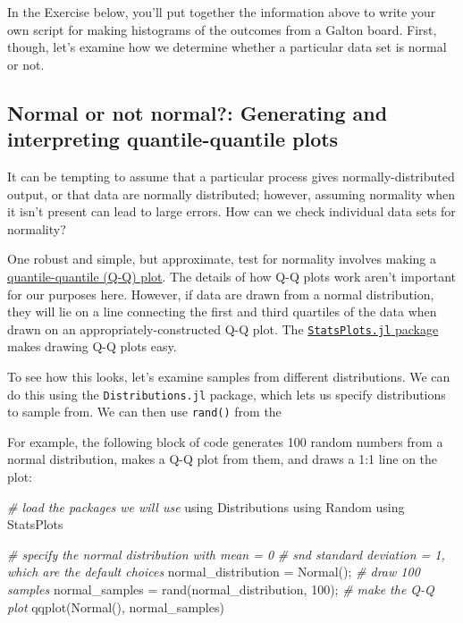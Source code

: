 \documentclass[
  11pt,
]{book}
\newenvironment{Shaded}{\begin{snugshade}}{\end{snugshade}}
\newcommand{\CommentTok}[1]{\textcolor[rgb]{0.37,0.37,0.37}{\textit{#1}}}
\newcommand{\FloatTok}[1]{\textcolor[rgb]{0.06,0.06,0.06}{#1}}
\newcommand{\NormalTok}[1]{#1}
\begin{document}
In the Exercise below, you'll put together the information above to write your own script for making histograms of the outcomes from a Galton board. First, though, let's examine how we determine whether a particular data set is normal or not.

\hypertarget{normal-or-not-normal-generating-and-interpreting-quantile-quantile-plots}{%
\subsection{Normal or not normal?: Generating and interpreting quantile-quantile plots}\label{normal-or-not-normal-generating-and-interpreting-quantile-quantile-plots}}

It can be tempting to assume that a particular process gives normally-distributed output, or that data are normally distributed; however, assuming normality when it isn't present can lead to large errors. How can we check individual data sets for normality?

One robust and simple, but approximate, test for normality involves making a \href{https://en.wikipedia.org/wiki/Q-Q_plot}{quantile-quantile (Q-Q) plot}. The details of how Q-Q plots work aren't important for our purposes here. However, if data are drawn from a normal distribution, they will lie on a line connecting the first and third quartiles of the data when drawn on an appropriately-constructed Q-Q plot. The \href{https://github.com/JuliaPlots/StatsPlots.jl}{\texttt{StatsPlots.jl} package} makes drawing Q-Q plots easy.

To see how this looks, let's examine samples from different distributions. We can do this using the \texttt{Distributions.jl} package, which lets us specify distributions to sample from. We can then use \texttt{rand()} from the

For example, the following block of code generates 100 random numbers from a normal distribution, makes a Q-Q plot from them, and draws a 1:1 line on the plot:

\begin{Shaded}
\begin{Highlighting}[]
\CommentTok{# load the packages we will use}
\NormalTok{using Distributions}
\NormalTok{using Random}
\NormalTok{using StatsPlots}

\CommentTok{# specify the normal distribution with mean = 0 }
\CommentTok{# snd standard deviation = 1, which are the default choices}
\NormalTok{normal_distribution = Normal();}
\CommentTok{# draw 100 samples}
\NormalTok{normal_samples = rand(normal_distribution, }\FloatTok{100}\NormalTok{);}
\CommentTok{# make the Q-Q plot}
\NormalTok{qqplot(Normal(), normal_samples) }
\end{Highlighting}
\end{Shaded}
\end{document}

